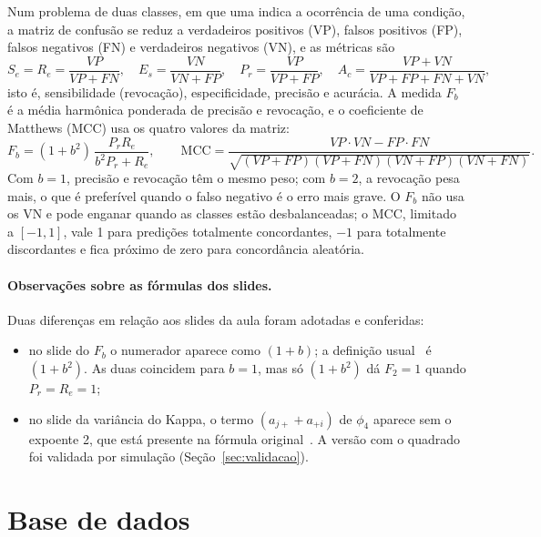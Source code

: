 \documentclass[12pt,a4paper]{article}
\begin{document}
Num problema de duas classes, em que uma indica a ocorrência de uma condição, a matriz de confusão se reduz a verdadeiros positivos (VP), falsos positivos (FP), falsos negativos (FN) e verdadeiros negativos (VN), e as métricas são
\begin{equation}
  S_e = R_e = \frac{VP}{VP + FN},\quad
  E_s = \frac{VN}{VN + FP},\quad
  P_r = \frac{VP}{VP + FP},\quad
  A_c = \frac{VP + VN}{VP + FP + FN + VN},
  \label{eq:binarias}
\end{equation}
isto é, sensibilidade (revocação), especificidade, precisão e acurácia. A medida $F_b$ é a média harmônica ponderada de precisão e revocação, e o coeficiente de Matthews (MCC) usa os quatro valores da matriz:
\begin{equation}
  F_b = (1 + b^2)\,\frac{P_r R_e}{b^2 P_r + R_e}, \qquad
  \text{MCC} = \frac{VP\cdot VN - FP\cdot FN}{\sqrt{(VP+FP)(VP+FN)(VN+FP)(VN+FN)}}.
  \label{eq:fb_mcc}
\end{equation}
Com $b = 1$, precisão e revocação têm o mesmo peso; com $b = 2$, a revocação pesa mais, o que é preferível quando o falso negativo é o erro mais grave. O $F_b$ não usa os VN e pode enganar quando as classes estão desbalanceadas; o MCC, limitado a $[-1, 1]$, vale 1 para predições totalmente concordantes, $-1$ para totalmente discordantes e fica próximo de zero para concordância aleatória.

\paragraph{Observações sobre as fórmulas dos slides.} Duas diferenças em relação aos slides da aula foram adotadas e conferidas:
\begin{itemize}
  \item no slide do $F_b$ o numerador aparece como $(1 + b)$; a definição usual~\cite{sokolova} é $(1 + b^2)$. As duas coincidem para $b = 1$, mas só $(1 + b^2)$ dá $F_2 = 1$ quando $P_r = R_e = 1$;
  \item no slide da variância do Kappa, o termo $(a_{j+} + a_{+i})$ de $\phi_4$ aparece sem o expoente 2, que está presente na fórmula original~\cite{congalton}. A versão com o quadrado foi validada por simulação (Seção~\ref{sec:validacao}).
\end{itemize}

\section{Base de dados}
\end{document}
